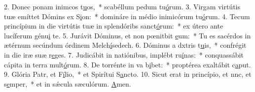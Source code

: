 2. Donec ponam inimcos t\uline{u}os,~* scabéllum pedum tu\uline{ó}rum.
3. Virgam virtútis tuæ emíttet Dómins ex S\uline{i}on:~* domináre in médio inimicórum tu\uline{ó}rum.
4. Tecum princípium in die virtútis tuæ in splendóribs sanct\uline{ó}rum:~* ex útero ante lucíferum génu\uline{i} te.
5. Jurávit Dóminus, et non pœnitbit \uline{e}um:~* Tu es sacérdos in ætérnum secúndum órdinem Melch\uline{í}sedech.
6. Dóminus a dxtris t\uline{u}is,~* confrégit in die iræ suæ r\uline{e}ges.
7. Judicábit in natiónibus, implébt ru\uline{í}nas:~* conquassábit cápita in terra mult\uline{ó}rum.
8. De torrénte in va b\uline{i}bet:~* proptérea exaltábit c\uline{a}put.
9. Glória Patr, et F\uline{í}lio,~* et Spirítui S\uline{a}ncto.
10. Sicut erat in princípio, et nnc, et s\uline{e}mper,~* et in sǽcula sæculórum. \uline{A}men.
